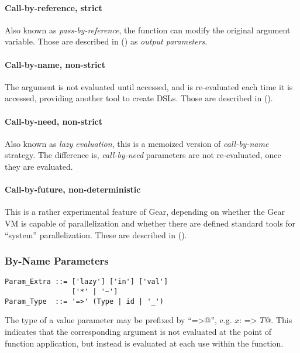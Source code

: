 \paragraph{Call-by-reference, strict}
Also known as {\em pass-by-reference}, the function can modify the original argument variable. Those are described in () as {\em output parameters}. 

\paragraph{Call-by-name, non-strict}
The argument is not evaluated until accessed, and is re-evaluated each time it is accessed, providing another tool to create DSLs. Those are described in (). 

\paragraph{Call-by-need, non-strict}
Also known as {\em lazy evaluation}, this is a memoized version of {\em call-by-name} strategy. The difference is, {\em call-by-need} parameters are not re-evaluated, once they are evaluated. 

\paragraph{Call-by-future, non-deterministic}
This is a rather experimental feature of Gear, depending on whether the Gear VM is capable of parallelization and whether there are defined standard tools for ``system'' parallelization. These are described in ().






\subsubsection{By-Name Parameters}
\label{sec:by-name-parameters}

\syntax\begin{lstlisting}
Param_Extra ::= ['lazy'] ['in'] ['val']
                ['*' | '~']
Param_Type  ::= '=>' (Type | id | '_')
\end{lstlisting}

The type of a value parameter may be prefixed by ``\lstinline@=>@'', e.g. \lstinline@$x$: => $T$@. This indicates that the corresponding argument is not evaluated at the point of function application, but instead is evaluated at each use within the function.

